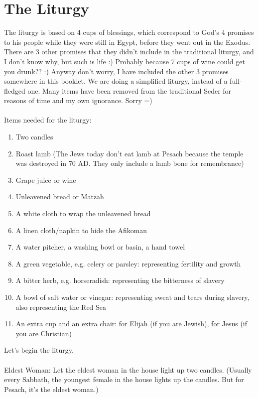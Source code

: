 \documentclass[10pt,oneside,footinclude=true,headinclude=true]{scrbook} %
\begin{document}
\section{The Liturgy}

The liturgy is based on 4 cups of blessings, which correspond to God's 4 promises to his people while they were still in Egypt, before they went out in the Exodus. There are 3 other promises that they didn't include in the traditional liturgy, and I don't know why, but such is life :) Probably because 7 cups of wine could get you drunk?? :) Anyway don't worry, I have included the other 3 promises somewhere in this booklet. We are doing a simplified liturgy, instead of a full-fledged one. Many items have been removed from the traditional Seder for reasons of time and my own ignorance. Sorry =)\\
\\
Items needed for the liturgy:
\begin{enumerate}
	\item{Two candles}
	\item{Roast lamb (The Jews today don't eat lamb at Pesach because the temple was destroyed in 70 AD. They only include a lamb bone for remembrance)}
	\item{Grape juice or wine}
	\item{Unleavened bread or Matzah}
	\item{A white cloth to wrap the unleavened bread}
	\item{A linen cloth/napkin to hide the Afikoman}
	\item{A water pitcher, a washing bowl or basin, a hand towel}
	\item{A green vegetable, e.g. celery or parsley: representing fertility and growth}
	\item{A bitter herb, e.g. horseradish: representing the bitterness of slavery}
	\item{A bowl of salt water or vinegar: representing sweat and tears during slavery, also representing the Red Sea}
	\item{An extra cup and an extra chair: for Elijah (if you are Jewish), for Jesus (if you are Christian)}
\end{enumerate}

\vspace{5mm}

\noindent Let's begin the liturgy.\\
\\
\small
Eldest Woman: Let the eldest woman in the house light up two candles. (Usually every Sabbath, the youngest female in the house lights up the candles. But for Pesach, it's the eldest woman.)\\
\end{document}
